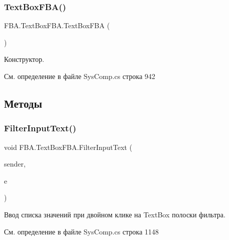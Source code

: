 \subsubsection{\texorpdfstring{Text\+Box\+F\+B\+A()}{TextBoxFBA()}}
{\footnotesize\ttfamily F\+B\+A.\+Text\+Box\+F\+B\+A.\+Text\+Box\+F\+BA (\begin{DoxyParamCaption}{ }\end{DoxyParamCaption})}



Конструктор. 



См. определение в файле Sys\+Comp.\+cs строка 942



\subsection{Методы}
\mbox{\label{class_f_b_a_1_1_text_box_f_b_a_ad4715f1975aabcb6b423c555e707c952}} 
\subsubsection{\texorpdfstring{Filter\+Input\+Text()}{FilterInputText()}}
{\footnotesize\ttfamily void F\+B\+A.\+Text\+Box\+F\+B\+A.\+Filter\+Input\+Text (\begin{DoxyParamCaption}\item[{object}]{sender,  }\item[{Mouse\+Event\+Args}]{e }\end{DoxyParamCaption})}



Ввод списка значений при двойном клике на Text\+Box полоски фильтра. 



См. определение в файле Sys\+Comp.\+cs строка 1148

\mbox{\label{class_f_b_a_1_1_text_box_f_b_a_a36c1f0cfdc9a2f0a2b60e467be3cf8d8}} 

